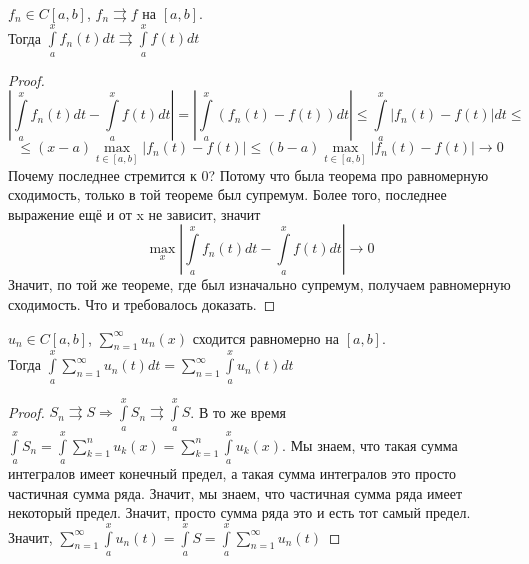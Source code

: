 
\begin{theorem} \thmslashn

  $f_n \in C[a, b]$, $f_n \rightrightarrows f$ на $[a, b]$.\\
  Тогда $\int\limits_a^x f_n(t)dt \rightrightarrows \int\limits_a^x f(t)dt$
\begin{proof} \thmslashn
  
  \[\left|\int\limits_a^x f_n(t)dt - \int\limits_a^x f(t)dt\right| = \left|\int\limits_a^x (f_n(t) - f(t))dt\right| \leq \int\limits_a^x |f_n(t) - f(t)|dt \leq \] \[\leq (x - a)\max\limits_{t\in [a, b]}{|f_n(t) - f(t)|} \leq (b - a)\max\limits_{t\in [a, b]}{|f_n(t) - f(t)|} \longrightarrow 0 \]
  Почему последнее стремится к 0? Потому что была теорема про равномерную сходимость, только в той теореме был супремум. Более того, последнее выражение ещё и от x не зависит, значит
  \[\max\limits_x \left|\int\limits_a^x f_n(t)dt - \int\limits_a^x f(t)dt\right| \longrightarrow 0\]
  Значит, по той же теореме, где был изначально супремум, получаем равномерную сходимость. Что и требовалось доказать.
\end{proof}
\end{theorem}

\begin{consequence} \thmslashn

  $u_n \in C[a, b]$, $\sum\limits_{n = 1}^{\infty} u_n(x)$ сходится равномерно на $[a, b]$.\\
  Тогда $\int\limits_{a}^x \sum\limits_{n = 1}^{\infty} u_n(t) dt = \sum\limits_{n = 1}^{\infty}\int\limits_{a}^x u_n(t) dt$
\begin{proof} \thmslashn
  
  $S_n \rightrightarrows S \Rightarrow \int\limits_a^x S_n \rightrightarrows \int\limits_a^x S$. В то же время $\int\limits_a^x S_n = \int\limits_a^x \sum\limits_{k = 1}^n u_k(x) = \sum\limits_{k = 1}^n\int\limits_a^x u_k(x)$. Мы знаем, что такая сумма интегралов имеет конечный предел, а такая сумма интегралов это просто частичная сумма ряда. Значит, мы знаем, что частичная сумма ряда имеет некоторый предел. Значит, просто сумма ряда это и есть тот самый предел.\\
  Значит, $\sum\limits_{n = 1}^{\infty}\int\limits_a^x u_n(t) = \int\limits_a^x S = \int\limits_{a}^x \sum\limits_{n = 1}^{\infty} u_n(t) $ 
\end{proof}
\end{consequence}

